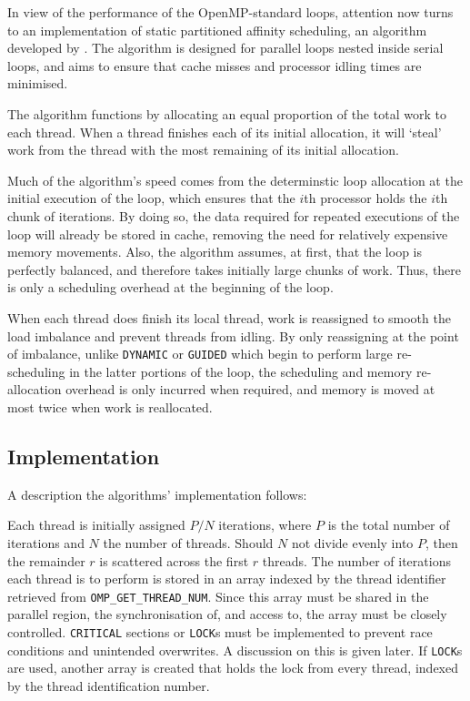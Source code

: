 \documentclass{article} %
\newcommand{\tp}{\texttt}
\begin{document}
In view of the performance of the OpenMP-standard loops, attention now turns to an implementation of static partitioned affinity scheduling, an algorithm developed by \citet{273046}.
The algorithm is designed for parallel loops nested inside serial loops, and aims to ensure that cache misses and processor idling times are minimised.

The algorithm functions by allocating an equal proportion of the total work to each thread. 
When a thread finishes each of its initial allocation, it will `steal' work from the thread with the most remaining of its initial allocation.

Much of the algorithm's speed comes from the determinstic loop allocation at the initial execution of the loop, which ensures that the $i$th processor holds the $i$th chunk of iterations.
By doing so, the data required for repeated executions of the loop will already be stored in cache, removing the need for relatively expensive memory movements.
Also, the algorithm assumes, at first, that the loop is perfectly balanced, and therefore takes initially large chunks of work.
Thus, there is only a scheduling overhead at the beginning of the loop.

When each thread does finish its local thread, work is reassigned to smooth the load imbalance and prevent threads from idling.
By only reassigning at the point of imbalance, unlike \tp{DYNAMIC} or \tp{GUIDED} which begin to perform large re-scheduling in the latter portions of the loop, the scheduling and memory re-allocation overhead is only incurred when required, and memory is moved at most twice when work is reallocated.

\subsection*{Implementation}

A description the algorithms' implementation follows:

Each thread is initially assigned $P/N$ iterations, where $P$ is the total number of iterations and $N$ the number of threads. 
Should $N$ not divide evenly into $P$, then the remainder $r$ is scattered across the first $r$ threads.
The number of iterations each thread is to perform is stored in an array indexed by the thread identifier retrieved from \tp{OMP\_GET\_THREAD\_NUM}.
Since this array must be shared in the parallel region, the synchronisation of, and access to, the array must be closely controlled.
\tp{CRITICAL} sections or \tp{LOCK}s must be implemented to prevent race conditions and unintended overwrites.
A discussion on this is given later.
If \tp{LOCK}s are used, another array is created that holds the lock from every thread, indexed by the thread identification number.
\end{document}
